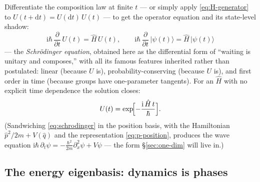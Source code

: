 \documentclass[11pt]{article}
\theoremstyle{plain}
\theoremstyle{definition}
\theoremstyle{remark}
\newcommand{\dd}{\mathrm{d}}
\newcommand{\ii}{\mathrm{i}}
\newcommand{\pd}[2]{\frac{\partial #1}{\partial #2}}
\newcommand{\op}[1]{\hat{#1}}
\newcommand{\ket}[1]{\lvert #1 \rangle}
\begin{document}
Differentiate the composition law at finite $t$ --- or simply apply
\eqref{eq:H-generator} to $U(t + \dd t) = U(\dd t)\,U(t)$ --- to get
the operator equation and its state-level shadow:
\begin{equation}
  \boxed{\;
  \ii\hbar\,\pd{}{t}\,U(t) = \op H\,U(t),
  \qquad
  \ii\hbar\,\pd{}{t}\,\ket{\psi(t)} = \op H\,\ket{\psi(t)}
  \;}
  \label{eq:schrodinger}
\end{equation}
--- the \emph{Schr\"odinger equation}, obtained here as the
differential form of ``waiting is unitary and composes,'' with all
its famous features inherited rather than postulated: linear
(because $U$ is), probability-conserving (because $U$ is), and
first order in time (because groups have one-parameter tangents).
For an $\op H$ with no explicit time dependence the solution
closes:
\begin{equation}
  U(t) = \exp\!\Bigl[-\frac{\ii\,\op H\,t}{\hbar}\Bigr].
  \label{eq:U-exponential}
\end{equation}
(Sandwiching \eqref{eq:schrodinger} in the position basis, with the
Hamiltonian $\op p^2/2m + V(\op q)$ and the representation
\eqref{eq:p-position}, produces the wave equation
$\ii\hbar\,\partial_t\psi = -\tfrac{\hbar^2}{2m}\partial_x^2\psi +
V\psi$ --- the form \S\ref{sec:one-dim} will live in.)

\subsection{The energy eigenbasis: dynamics is phases}
\label{sec:stationary-states}
\end{document}
